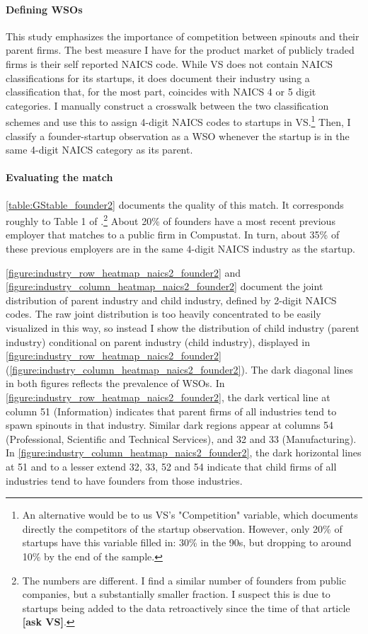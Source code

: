 \documentclass[11pt,english]{article}
\begin{document}
\paragraph{Defining WSOs}

This study emphasizes the importance of competition between spinouts and their parent firms. The best measure I have for the product market of publicly traded firms is their self reported NAICS code. While VS does not contain NAICS classifications for its startups, it does document their industry using a classification that, for the most part, coincides with NAICS 4 or 5 digit categories. I manually construct a crosswalk between the two classification schemes and use this to assign 4-digit NAICS codes to startups in VS.\footnote{An alternative would be to us VS's "Competition" variable, which documents directly the competitors of the startup observation. However, only 20\% of startups have this variable filled in: 30\% in the 90s, but dropping to around 10\% by the end of the sample.} Then, I classify a founder-startup observation as a WSO whenever the startup is in the same 4-digit NAICS category as its parent. 

\paragraph{Evaluating the match}

\autoref{table:GStable_founder2} documents the quality of this match. It corresponds roughly to Table 1 of \cite{gompers_entrepreneurial_2005}.\footnote{The numbers are different. I find a similar number of founders from public companies, but a substantially smaller fraction. I suspect this is due to startups being added to the data retroactively since the time of that article \textbf{[ask VS]}.} About 20\% of founders have a most recent previous employer that matches to a public firm in Compustat. In turn, about 35\% of these previous employers are in the same 4-digit NAICS industry as the startup.

\autoref{figure:industry_row_heatmap_naics2_founder2} and \autoref{figure:industry_column_heatmap_naics2_founder2} document the joint distribution of parent industry and child industry, defined by 2-digit NAICS codes. The raw joint distribution is too heavily concentrated to be easily visualized in this way, so instead I show the distribution of child industry (parent industry) conditional on parent industry (child industry), displayed in \autoref{figure:industry_row_heatmap_naics2_founder2} (\autoref{figure:industry_column_heatmap_naics2_founder2}). The dark diagonal lines in both figures reflects the prevalence of WSOs. In \autoref{figure:industry_row_heatmap_naics2_founder2}, the dark vertical line at column 51 (Information) indicates that parent firms of all industries tend to spawn spinouts in that industry. Similar dark regions appear at columns 54 (Professional, Scientific and Technical Services), and 32 and 33 (Manufacturing). In \autoref{figure:industry_column_heatmap_naics2_founder2}, the dark horizontal lines at 51 and to a lesser extend 32, 33, 52 and 54 indicate that child firms of all industries tend to have founders from those industries.
\end{document}
